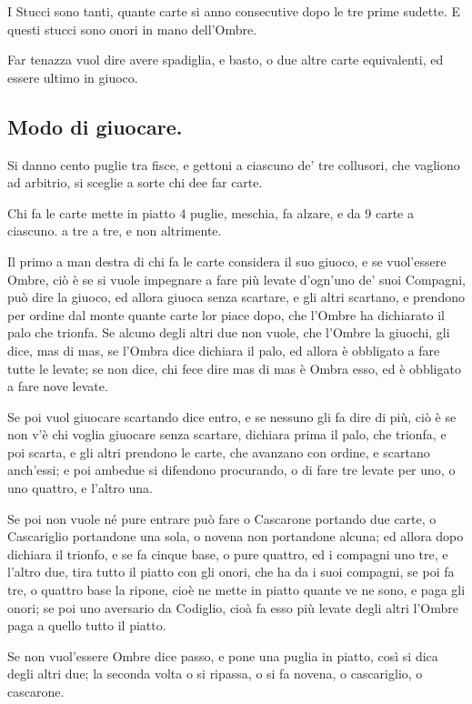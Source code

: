 \documentclass[11pt,a6paper]{article}
\begin{document}
I Stucci sono tanti, quante carte si anno
consecutive dopo le tre prime sudette. E
questi stucci sono onori in mano dell'Ombre.

Far tenazza vuol dire avere spadiglia, e
basto, o due altre carte equivalenti, ed essere
ultimo in giuoco.


\subsection{Modo di giuocare.}

Si danno cento puglie tra fisce, e gettoni
a ciascuno de' tre collusori, che vagliono
ad arbitrio, si sceglie a sorte chi dee far carte.

Chi fa le carte mette in piatto 4 puglie,
meschia, fa alzare, e da 9 carte a ciascuno.
a tre a tre, e non altrimente.

Il primo a man destra di chi fa le carte
considera il suo giuoco, e se vuol'essere
Ombre, ciò è se si vuole impegnare a fare più
levate d'ogn'uno de' suoi Compagni, può dire
la giuoco, ed allora giuoca senza scartare, e
gli altri scartano, e prendono per ordine dal
monte quante carte lor piace dopo, che l'Ombre
ha dichiarato il palo che trionfa. Se
alcuno degli altri due non vuole, che l'Ombre
la giuochi, gli dice, mas di mas, se l'Ombra
dice dichiara il palo, ed allora è obbligato a
fare tutte le levate; se non dice, chi fece
dire mas di mas è Ombra esso, ed è obbligato
a fare nove levate.

Se poi vuol giuocare scartando dice entro,
e se nessuno gli fa dire di più, ciò è se
non v'è chi voglia giuocare senza scartare,
dichiara prima il palo, che trionfa, e poi
scarta, e gli altri prendono le carte, che avanzano
con ordine, e scartano anch'essi; e poi
ambedue si difendono procurando, o di fare
tre levate per uno, o uno quattro, e l'altro
una.

Se poi non vuole né pure entrare può fare
o Cascarone portando due carte, o Cascariglio
portandone una sola, o novena non
portandone alcuna; ed allora dopo dichiara
il trionfo, e se fa cinque base, o pure
quattro, ed i compagni uno tre, e l'altro due,
tira tutto il piatto con gli onori, che ha da i
suoi compagni, se poi fa tre, o quattro base la
ripone, cioè ne mette in piatto quante ve ne
sono, e paga gli onori; se poi uno aversario
da Codiglio, cioà fa esso più levate degli altri
l'Ombre paga a quello tutto il piatto.

Se non vuol'essere Ombre dice passo, e
pone una puglia in piatto, così si dica degli
altri due; la seconda volta o si ripassa, o si fa
novena, o cascariglio, o cascarone.
\end{document}
